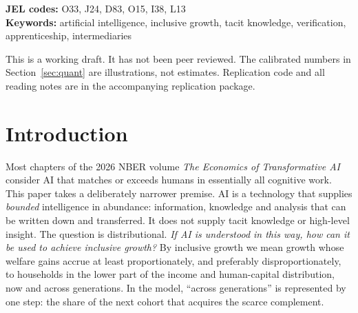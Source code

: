 \documentclass[12pt]{article}
\theoremstyle{remark}
\begin{document}
\begin{titlepage}
\begin{abstract}
\noindent Suppose AI supplies codifiable cognition in abundance but not tacit local knowledge, the capacity to bear the consequences of error, or the work of turning a vague need into a well-specified task. When does the resulting growth favour lower-income households, now and in the next cohort? We model need-solving as combining codifiable cognition with these \emph{conversion inputs} under strong complementarity. In a joint economy where conversion-input holders split their time in fixed shares between need-solving and a task market, five conditions and a supporting one are jointly sufficient for relatively progressive gains and a non-falling share of the next cohort holding conversion inputs: these inputs are widely held; verification is intermediated by default; AI stays non-autonomous, packaging is cheap and knowledge does not fall with income; fees leave intermediaries above a density threshold; apprenticeship is subsidised and mentor capacity suffices; and error risk is pooled. Each of the five conditions can fail alone and break the result. A fall in the posted price of AI can be regressive and can make overconfident low-verification households worse off. Each condition maps to an observable and a class of instruments, stated conditionally.
\end{abstract}

\noindent\textbf{JEL codes:} O33, J24, D83, O15, I38, L13\\
\textbf{Keywords:} artificial intelligence, inclusive growth, tacit knowledge, verification, apprenticeship, intermediaries

\vfill
\noindent\small This is a working draft. It has not been peer reviewed. The calibrated numbers in Section~\ref{sec:quant} are illustrations, not estimates. Replication code and all reading notes are in the accompanying replication package.
\end{titlepage}

\section{Introduction}\label{sec:intro}

Most chapters of the 2026 NBER volume \emph{The Economics of Transformative AI} \citep{agrawal2026volume} consider AI that matches or exceeds humans in essentially all cognitive work. This paper takes a deliberately narrower premise. AI is a technology that supplies \emph{bounded} intelligence in abundance: information, knowledge and analysis that can be written down and transferred. It does not supply tacit knowledge or high-level insight. The question is distributional. \emph{If AI is understood in this way, how can it be used to achieve inclusive growth?} By inclusive growth we mean growth whose welfare gains accrue at least proportionately, and preferably disproportionately, to households in the lower part of the income and human-capital distribution, now and across generations. In the model, ``across generations'' is represented by one step: the share of the next cohort that acquires the scarce complement.
\end{document}
